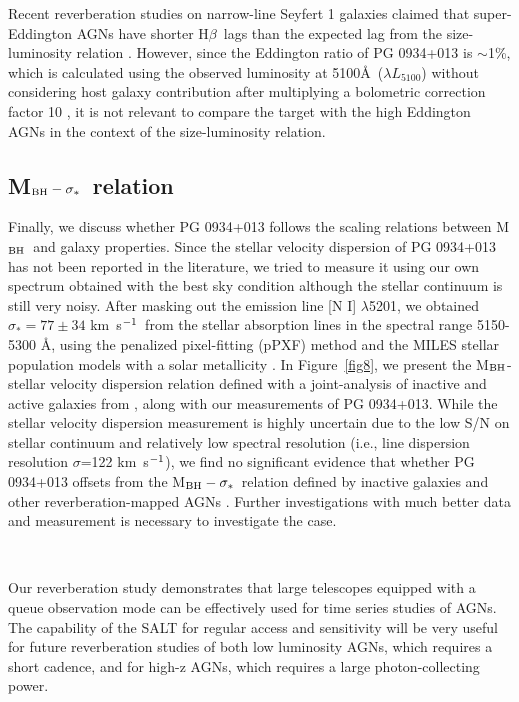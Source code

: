 \documentclass[iop]{emulateapj}
\newcommand{\Hb}{\rm H{$\beta$}}
\newcommand{\mbh}{M$_{\rm BH}$}
\newcommand{\msigma}{M$_{\rm BH}-\sigma_{*}$}
\newcommand{\kms}{km~s$^{\rm -1}$}
\newcommand{\lam}{$\lambda$}
\newcommand{\lf}{\ensuremath{L_{5100}}}
\begin{document}
Recent reverberation studies on narrow-line Seyfert 1 galaxies claimed that super-Eddington AGNs have shorter \Hb\ lags than the expected lag from the size-luminosity relation \citep{Du2015,Du2016}. However, since the Eddington ratio of PG 0934+013 is $\sim$1\%, which is calculated using the observed luminosity at 5100\AA\ ($\lambda$\lf) without considering host galaxy contribution after multiplying a bolometric correction factor 10 \citep{WooUrry2002}, it is not relevant to compare the target with the high Eddington AGNs in the context of the size-luminosity relation.

\subsection{\msigma\ relation}

Finally, we discuss whether PG 0934+013 follows the scaling relations between \mbh\ and galaxy properties. Since the stellar 
velocity dispersion of PG 0934+013 has not been reported in the literature, we tried to measure it using our own spectrum obtained with the best sky condition although the stellar continuum is still very noisy. After masking out the emission line [N I] \lam5201, we obtained $\sigma_{*} = 77\pm34$ \kms\ from the stellar absorption lines in the spectral range 5150-5300 \AA, using the penalized pixel-fitting (pPXF) method and the MILES stellar population models with a solar metallicity \citep{CappellariEmsellem2004}.
In Figure~\ref{fig8}, we present the  \mbh-stellar velocity dispersion relation defined with a joint-analysis of inactive and active galaxies from \citet[][see also \citet{Woo+13}]{Woo2015}, along with our measurements of PG 0934+013. While the stellar velocity dispersion measurement is highly uncertain due to the low S/N on stellar continuum and relatively low spectral resolution (i.e., line dispersion resolution $\sigma$=122 \kms), we find no significant evidence that whether PG 0934+013 offsets from the \msigma\ relation defined by inactive galaxies and other reverberation-mapped AGNs \citep{Woo+13,Woo2015}. Further investigations with much better data and measurement is necessary to investigate the case.

~

Our reverberation study demonstrates that large telescopes equipped with a queue observation mode 
can be effectively used for time series studies of AGNs. The capability of the SALT for regular access
and sensitivity will be very useful for future reverberation studies of both low luminosity AGNs, which requires a short cadence, and for high-z AGNs, which requires a large photon-collecting power.
\end{document}
